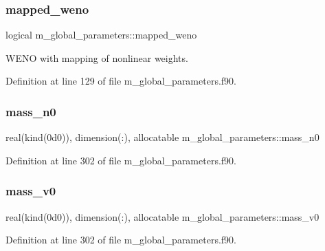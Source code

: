 \subsubsection{\texorpdfstring{mapped\+\_\+weno}{mapped\_weno}}
{\footnotesize\ttfamily logical m\+\_\+global\+\_\+parameters\+::mapped\+\_\+weno}



W\+E\+NO with mapping of nonlinear weights. 



Definition at line 129 of file m\+\_\+global\+\_\+parameters.\+f90.

\mbox{\label{namespacem__global__parameters_ae3701f74c9487c9e56c2a11fb6a52e40}} 
\subsubsection{\texorpdfstring{mass\+\_\+n0}{mass\_n0}}
{\footnotesize\ttfamily real(kind(0d0)), dimension(\+:), allocatable m\+\_\+global\+\_\+parameters\+::mass\+\_\+n0}



Definition at line 302 of file m\+\_\+global\+\_\+parameters.\+f90.

\mbox{\label{namespacem__global__parameters_a6a06981be6cdab78452a106009022aa4}} 
\subsubsection{\texorpdfstring{mass\+\_\+v0}{mass\_v0}}
{\footnotesize\ttfamily real(kind(0d0)), dimension(\+:), allocatable m\+\_\+global\+\_\+parameters\+::mass\+\_\+v0}



Definition at line 302 of file m\+\_\+global\+\_\+parameters.\+f90.

\mbox{\label{namespacem__global__parameters_a3981c7e6886ba3cde245ce4dcc6ca664}} 
